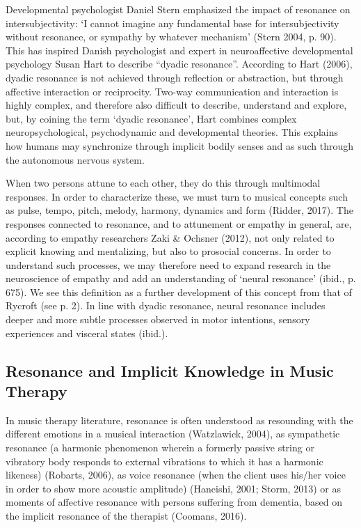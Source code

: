 \begin{adjmulticols}{2}{0mm}{0mm}
Developmental psychologist Daniel Stern emphasized the impact of resonance on intersubjectivity: ‘I cannot imagine any fundamental base for intersubjectivity without resonance, or sympathy by whatever mechanism’ (Stern 2004, p. 90). This has inspired Danish psychologist and expert in neuroaffective developmental psychology Susan Hart to describe \enquote{dyadic resonance}. According to Hart (2006), dyadic resonance is not achieved through reflection or abstraction, but through affective interaction or reciprocity. Two-way communication and interaction is highly complex, and therefore also difficult to describe, understand and explore, but, by coining the term ‘dyadic resonance’, Hart combines complex neuropsychological, psychodynamic and developmental theories. This explains how humans may synchronize through implicit bodily senses and as such through the autonomous nervous system.

When two persons attune to each other, they do this through multimodal responses. In order to characterize these, we must turn to musical concepts such as pulse, tempo, pitch, melody, harmony, dynamics and form (Ridder, 2017). The responses connected to resonance, and to attunement or empathy in general, are, according to empathy researchers Zaki \& Ochsner (2012), not only related to explicit knowing and mentalizing, but also to prosocial concerns. In order to understand such processes, we may therefore need to expand research in the neuroscience of empathy and add an understanding of ‘neural resonance’ (ibid., p. 675). We see this definition as a further development of this concept from that of Rycroft (see p. 2). In line with dyadic resonance, neural resonance includes deeper and more subtle processes observed in motor intentions, sensory experiences and visceral states (ibid.). 

\subsection{Resonance and Implicit Knowledge in Music Therapy}
In music therapy literature, resonance is often understood as resounding with the different emotions in a musical interaction (Watzlawick, 2004), as sympathetic resonance (a harmonic phenomenon wherein a formerly passive string or vibratory body responds to external vibrations to which it has a harmonic likeness) (Robarts, 2006), as voice resonance (when the client uses his/her voice in order to show more acoustic amplitude) (Haneishi, 2001; Storm, 2013) or as moments of affective resonance with persons suffering from dementia, based on the implicit resonance of the therapist (Coomans, 2016).


\end{adjmulticols}

